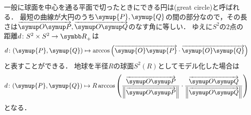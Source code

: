 \documentclass{ltjsarticle}
\begin{document}
一般に球面を中心を通る平面で切ったときにできる円は(great circle)と呼ばれる．
最短の曲線が大円のうち\(\symup{P}, \symup{Q}\)の間の部分なので，その長さは\(\geovec{O}{P}, \geovec{O}{Q}\)のなす角に等しい．
ゆえに\(S^2\)の\(2\)点の距離\(d \colon S^2 \times S^2 \to {\Real}_{\mathord{+}}\)は
\begin{align*}
    d \colon \tuple{\symup{P}, \symup{Q}} \mapsto
    \arccos \left(\overrightarrow{\symup{O}\symup{P}} \cdot \overrightarrow{\symup{O}\symup{Q}}\right)
\end{align*}
と表すことができる．
地球を半径\(R\)の球面\(S^2(R)\)としてモデル化した場合は
\begin{align*}
    d \colon \tuple{\symup{P}, \symup{Q}} \mapsto
    R \arccos \left(%
        \frac{%
            \geovec{O}{P}
        }{%
            \left\lVert \geovec{O}{P} \right\rVert
        } \cdot
        \frac{%
            \geovec{O}{Q}
        }{%
            \left\lVert \geovec{O}{Q} \right\rVert
        }
    \right)
\end{align*}
となる．
\end{document}
